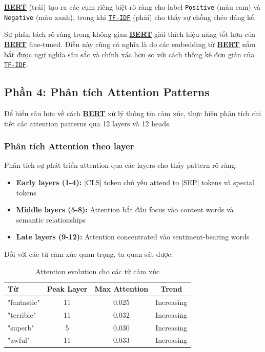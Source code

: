 \hyperref[acro:bert]{\textbf{BERT}} (trái) tạo ra các cụm riêng biệt rõ ràng cho label \texttt{Positive} (màu cam) và \texttt{Negative} (màu xanh), trong khi \hyperref[acro:tfidf]{\texttt{TF-IDF}} (phải) cho thấy sự chồng chéo đáng kể.

Sự phân tách rõ ràng trong không gian \hyperref[acro:bert]{\textbf{BERT}} giải thích hiệu năng tốt hơn của \hyperref[acro:bert]{\textbf{BERT}} fine-tuned. Điều này cũng có nghĩa là do các embedding từ \hyperref[acro:bert]{\textbf{BERT}} nắm bắt được ngữ nghĩa sâu sắc và chính xác hơn so với cách thống kê đơn giản của \hyperref[acro:tfidf]{\texttt{TF-IDF}}.

\subsection{Phần 4: Phân tích Attention Patterns}
\label{ssec:attention_analysis}

Để hiểu sâu hơn về cách \hyperref[acro:bert]{\textbf{BERT}} xử lý thông tin cảm xúc, thực hiện phân tích chi tiết các attention patterns qua 12 layers và 12 heads.

\subsubsection{Phân tích Attention theo layer}

Phân tích sự phát triển attention qua các layers cho thấy pattern rõ ràng:

\begin{itemize}
    \item \textbf{Early layers (1-4):} [CLS] token chủ yếu attend to [SEP] tokens và special tokens
    \item \textbf{Middle layers (5-8):} Attention bắt đầu focus vào content words và semantic relationships  
    \item \textbf{Late layers (9-12):} Attention concentrated vào sentiment-bearing words
\end{itemize}

Đối với các từ cảm xúc quan trọng, ta quan sát được:

\begin{table}[H]
\centering
\caption{Attention evolution cho các từ cảm xúc}
\label{tab:emotion_word_attention}
\begin{tabular}{lccc}
\toprule
\textbf{Từ} & \textbf{Peak Layer} & \textbf{Max Attention} & \textbf{Trend} \\
\midrule
"fantastic" & 11 & 0.025 & Increasing \\
"terrible" & 11 & 0.032 & Increasing \\
"superb" & 5 & 0.030 & Increasing \\
"awful" & 11 & 0.033 & Increasing \\
\bottomrule
\end{tabular}
\end{table}

